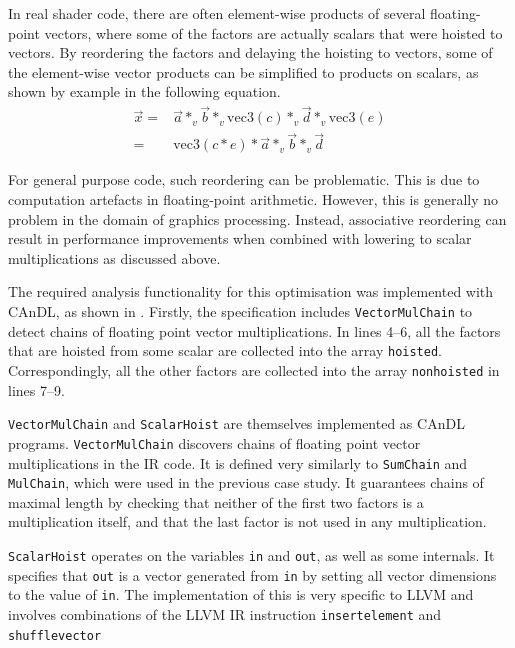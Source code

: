     In real shader code, there are often element-wise products of several
    floating-point vectors, where some of the factors are actually scalars
    that were hoisted to vectors.
    By reordering the factors and delaying the hoisting to vectors, some of the
    element-wise vector products can be simplified to products on scalars, as
    shown by example in the following equation.
    \begin{align*}
        \vec x={}&\vec a*_v\vec b*_v\text{vec3}(c)*_v\vec d*_v\text{vec3}(e)\\
        ={}&\text{vec3}(c*e)*\vec a*_v\vec b*_v\vec d
    \end{align*}

    For general purpose code, such reordering can be problematic.
    This is due to computation artefacts in floating-point arithmetic.
    However, this is generally no problem in the domain of graphics processing.
    Instead, associative reordering can result in performance improvements
    when combined with lowering to scalar multiplications as discussed above.

    The required analysis functionality for this optimisation was implemented
    with CAnDL, as shown in .
    Firstly, the specification includes \texttt{VectorMulChain} to detect 
    chains of floating point vector multiplications.
    In lines 4--6, all the factors that are hoisted from some scalar are
    collected into the array {\tt hoisted}.
    Correspondingly, all the other factors are collected into the array
    {\tt nonhoisted} in lines 7--9.

    {\tt VectorMulChain} and {\tt ScalarHoist} are themselves implemented as
    CAnDL programs.
    {\tt VectorMulChain} discovers chains of floating point vector
    multiplications in the IR code.
    It is defined very similarly to {\tt SumChain} and {\tt MulChain}, which
    were used in the previous case study.
    It guarantees chains of maximal length by checking that neither of the first
    two factors is a multiplication itself, and that the last factor is not used
    in any multiplication.

    \texttt{ScalarHoist} operates on the variables {\tt in} and {\tt out}, as
    well as some internals.
    It specifies that {\tt out} is a vector generated from {\tt in} by setting
    all vector dimensions to the value of {\tt in}.
    The implementation of this is very specific to LLVM and involves
    combinations of the LLVM IR instruction {\tt insertelement} and
    {\tt shufflevector}

